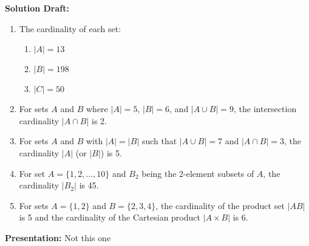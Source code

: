 \documentclass{article}
\begin{document}
\noindent\textbf{Solution Draft:} 


\begin{enumerate}
    \item The cardinality of each set:
    \begin{enumerate}
        \item \( |A| = 13 \)
        \item \( |B| = 198 \)
        \item \( |C| = 50 \)
        
    \end{enumerate}
    
    \item For sets \( A \) and \( B \) where \( |A| = 5 \), \( |B| = 6 \), and \( |A \cup B| = 9 \), the intersection cardinality \( |A \cap B| \) is 2.
    
    \item For sets \( A \) and \( B \) with \( |A| = |B| \) such that \( |A \cup B| = 7 \) and \( |A \cap B| = 3 \), the cardinality \( |A| \) (or \( |B| \)) is 5.
    
    \item For set \( A = \{1, 2, \ldots, 10\} \) and \( B_2 \) being the 2-element subsets of \( A \), the cardinality \( |B_2| \) is 45.
    
    \item For sets \( A = \{1, 2\} \) and \( B = \{2, 3, 4\} \), the cardinality of the product set \( |AB| \) is 5 and the cardinality of the Cartesian product \( |A \times B| \) is 6.
\end{enumerate}

\noindent\textbf{Presentation:} Not this one

\vspace{0.5cm} %
\end{document}
